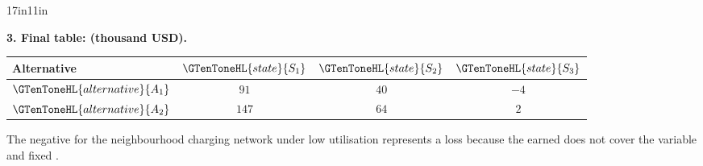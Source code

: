 \begin{CalculationLandscape}{17in}{11in}
\noindent\begin{minipage}{\linewidth}
\textbf{3. Final  table:  (thousand USD).}
\begin{center}
\begin{tabular}{@{}lccc@{}}
\toprule
Alternative & \(\GTenToneHL{state}{S_1}\) & \(\GTenToneHL{state}{S_2}\) & \(\GTenToneHL{state}{S_3}\) \\
\midrule
\(\GTenToneHL{alternative}{A_1}\) & \(91\) & \(40\) & \(-4\) \\
\(\GTenToneHL{alternative}{A_2}\) & \(147\) & \(64\) & \(2\) \\
\bottomrule
\end{tabular}
\end{center}
\end{minipage}


	The negative  for the neighbourhood charging network under low
	utilisation represents a loss because the  earned does not cover the
	variable and fixed .


\end{CalculationLandscape}



